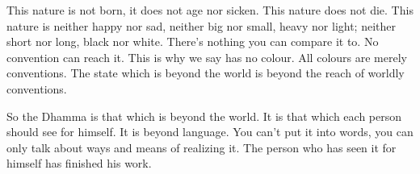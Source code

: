 This nature is not born, it does not age nor sicken. This nature does not die. This nature is neither happy nor sad, neither big nor small, heavy nor light; neither short nor long, black nor white. There's nothing you can compare it to. No convention can reach it. This is why we say  has no colour. All colours are merely conventions. The state which is beyond the world is beyond the reach of worldly conventions.

So the Dhamma is that which is beyond the world. It is that which each person should see for himself. It is beyond language. You can't put it into words, you can only talk about ways and means of realizing it. The person who has seen it for himself has finished his work.

